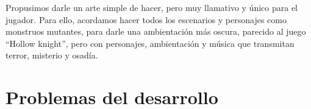 \documentclass{article}
\begin{document}
Propusimos darle un arte simple de hacer, pero muy llamativo y único para el jugador. Para ello, acordamos hacer todos los escenarios y personajes como monstruos mutantes, para darle una ambientación más oscura, parecido al juego “Hollow knight”, pero con personajes, ambientación y música que transmitan terror, misterio y osadía.

\section{Problemas del desarrollo}



\end{document}
